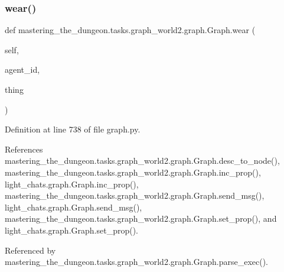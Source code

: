 \subsubsection{\texorpdfstring{wear()}{wear()}}
{\footnotesize\ttfamily def mastering\+\_\+the\+\_\+dungeon.\+tasks.\+graph\+\_\+world2.\+graph.\+Graph.\+wear (\begin{DoxyParamCaption}\item[{}]{self,  }\item[{}]{agent\+\_\+id,  }\item[{}]{thing }\end{DoxyParamCaption})}



Definition at line 738 of file graph.\+py.



References mastering\+\_\+the\+\_\+dungeon.\+tasks.\+graph\+\_\+world2.\+graph.\+Graph.\+desc\+\_\+to\+\_\+node(), mastering\+\_\+the\+\_\+dungeon.\+tasks.\+graph\+\_\+world2.\+graph.\+Graph.\+inc\+\_\+prop(), light\+\_\+chats.\+graph.\+Graph.\+inc\+\_\+prop(), mastering\+\_\+the\+\_\+dungeon.\+tasks.\+graph\+\_\+world2.\+graph.\+Graph.\+send\+\_\+msg(), light\+\_\+chats.\+graph.\+Graph.\+send\+\_\+msg(), mastering\+\_\+the\+\_\+dungeon.\+tasks.\+graph\+\_\+world2.\+graph.\+Graph.\+set\+\_\+prop(), and light\+\_\+chats.\+graph.\+Graph.\+set\+\_\+prop().



Referenced by mastering\+\_\+the\+\_\+dungeon.\+tasks.\+graph\+\_\+world2.\+graph.\+Graph.\+parse\+\_\+exec().

